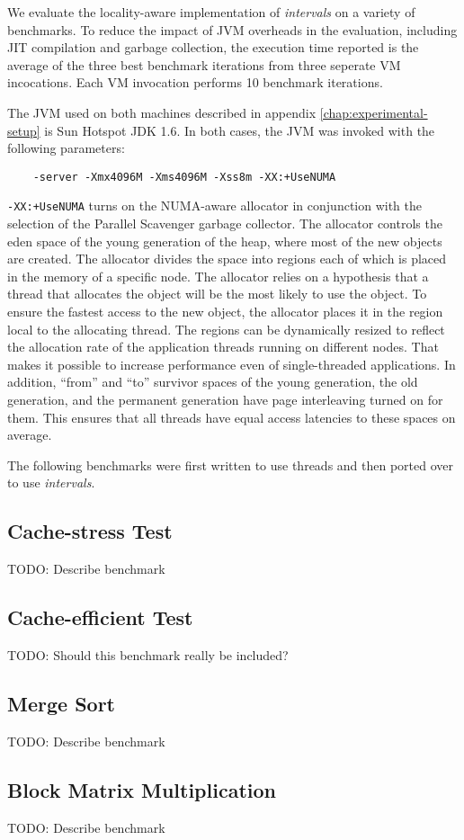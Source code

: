 We evaluate the locality-aware implementation of \emph{intervals} on a
variety of benchmarks. To reduce the impact of JVM overheads in the
evaluation, including JIT compilation and garbage collection, the
execution time reported is the average of the three best benchmark
iterations from three seperate VM incocations. Each VM invocation
performs 10 benchmark iterations.

The JVM used on both machines described in appendix
\ref{chap:experimental-setup} is Sun Hotspot JDK 1.6. In both cases,
the JVM was invoked with the following parameters:

\begin{verbatim}
    -server -Xmx4096M -Xms4096M -Xss8m -XX:+UseNUMA
\end{verbatim}

\verb!-XX:+UseNUMA! turns on the NUMA-aware allocator in conjunction
with the selection of the Parallel Scavenger garbage collector. The
allocator controls the eden space of the young generation of the heap,
where most of the new objects are created. The allocator divides the
space into regions each of which is placed in the memory of a specific
node. The allocator relies on a hypothesis that a thread that
allocates the object will be the most likely to use the object. To
ensure the fastest access to the new object, the allocator places it
in the region local to the allocating thread. The regions can be
dynamically resized to reflect the allocation rate of the application
threads running on different nodes. That makes it possible to increase
performance even of single-threaded applications. In addition,
``from'' and ``to'' survivor spaces of the young generation, the old
generation, and the permanent generation have page interleaving turned
on for them. This ensures that all threads have equal access latencies
to these spaces on average.

The following benchmarks were first written to use threads and then
ported over to use \emph{intervals}.

\subsection*{Cache-stress Test}

TODO: Describe benchmark

\subsection*{Cache-efficient Test}

TODO: Should this benchmark really be included?

\subsection*{Merge Sort}

TODO: Describe benchmark

\subsection*{Block Matrix Multiplication}

TODO: Describe benchmark


